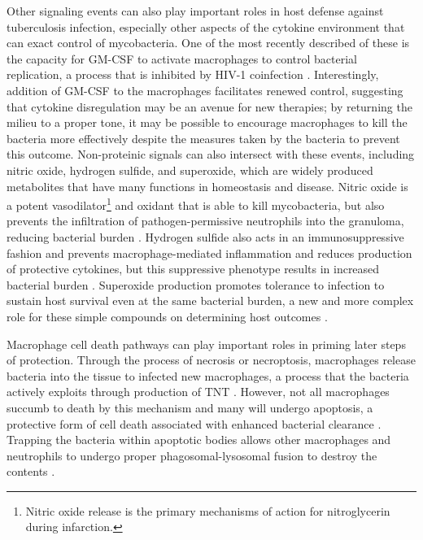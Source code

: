 Other signaling events can also play important roles in host defense against tuberculosis infection, especially other aspects of the cytokine environment that can exact control of mycobacteria. One of the most recently described of these is the capacity for GM\hyp{}CSF to activate macrophages to control bacterial replication, a process that is inhibited by HIV\hyp{}1 coinfection \citep{Bryson2019}. Interestingly, addition of GM\hyp{}CSF to the macrophages facilitates renewed control, suggesting that cytokine disregulation may be an avenue for new therapies; by returning the milieu to a proper tone, it may be possible to encourage macrophages to kill the bacteria more effectively despite the measures taken by the bacteria to prevent this outcome. Non\hyp{}proteinic signals can also intersect with these events, including nitric oxide, hydrogen sulfide, and superoxide, which are widely produced metabolites that have many functions in homeostasis and disease. Nitric oxide is a potent vasodilator\footnote{Nitric oxide release is the primary mechanisms of action for nitroglycerin during infarction.} and oxidant that is able to kill mycobacteria, but also prevents the infiltration of pathogen\hyp{}permissive neutrophils into the granuloma, reducing bacterial burden \citep{Mishra2017b}. Hydrogen sulfide also acts in an immunosuppressive fashion and prevents macrophage\hyp{}mediated inflammation and reduces production of protective cytokines, but this suppressive phenotype results in increased bacterial burden \citep{Rahman2020}. Superoxide production promotes tolerance to infection to sustain host survival even at the same bacterial burden, a new and more complex role for these simple compounds on determining host outcomes \citep{Olive2018}.

Macrophage cell death pathways can play important roles in priming later steps of protection. Through the process of necrosis or necroptosis, macrophages release bacteria into the tissue to infected new macrophages, a process that the bacteria actively exploits through production of TNT \citep{Guirado2013, Pajuelo2018}. However, not all macrophages succumb to death by this mechanism and many will undergo apoptosis, a protective form of cell death associated with enhanced bacterial clearance \citep{Divangahi2013}. Trapping the bacteria within apoptotic bodies allows other macrophages and neutrophils to undergo proper phagosomal\hyp{}lysosomal fusion to destroy the contents \citep{Dallenga2017, Molloy1994, Mahamed2017, Behar2011}.

